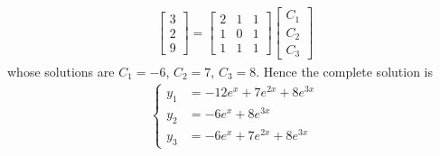 \begin{Answer}
\begin{align*}
\begin{bmatrix}
3\\
2\\
9
\end{bmatrix}   
=
\begin{bmatrix}
2 & 1 & 1\\
1 & 0 & 1\\
1 & 1 & 1
\end{bmatrix}
\begin{bmatrix}
C_1\\
C_2\\
C_3
\end{bmatrix}
\end{align*}
whose solutions are $C_1 = -6$, $C_2 = 7$, $C_3 = 8$. Hence the complete solution is
\begin{align*}
\left\{\begin{alignedat}{1}
y_1 &= -12e^{x} + 7e^{2x} + 8e^{3x} \\
y_2 &= -6e^{x} + 8e^{3x} \\
y_3 &= -6e^{x} + 7e^{2x} + 8e^{3x}
\end{alignedat} \right.
\end{align*}
\end{Answer}

